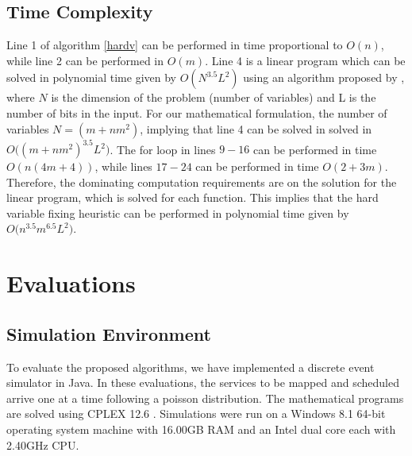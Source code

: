 \documentclass[conference]{IEEEtran}
\begin{document}
\subsection{Time Complexity}

Line 1 of algorithm \ref{hardv} can be performed in time proportional to $O(n)$, while line 2 can be performed in $O(m)$. Line 4 is a linear program which can be solved in polynomial time given by $O(N^{3.5}L^2)$ using an algorithm proposed by \cite{Karmarkar84}, where $N$ is the dimension of the problem (number of variables) and L is the number of bits in the input. For our mathematical formulation, the number of variables $N = (m + nm^2)$, implying that line 4 can be solved in solved in $O\big((m+nm^2)^{3.5} L^2\big)$. The for loop in lines $9-16$ can be performed in time $O(n(4m + 4))$, while lines $17-24$ can be performed in time $O(2+3m)$. Therefore, the dominating computation requirements are on the solution for the linear program, which is solved for each function. This implies that the hard variable fixing heuristic can be performed in polynomial time given by $O\big(n^{3.5}m^{6.5} L^2\big)$.

\section{Evaluations}\label{evaluation}

\subsection{Simulation Environment}

To evaluate the proposed algorithms, we have implemented a discrete event simulator in Java. In these evaluations, the services to be mapped and scheduled arrive one at a time following a poisson distribution. The mathematical programs are solved using CPLEX 12.6 \cite{CPLEX12.6}. Simulations were run on a Windows 8.1 64-bit operating system machine with 16.00GB RAM and an Intel dual core each with 2.40GHz CPU. 
\end{document}
